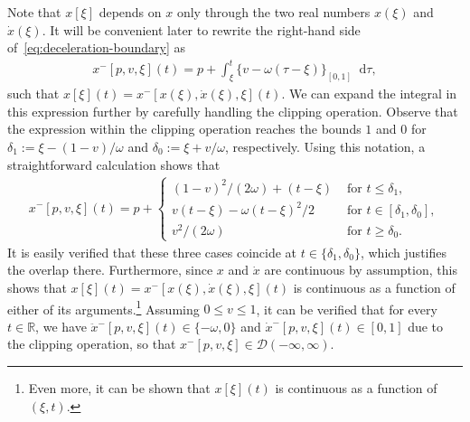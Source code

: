 \documentclass[a4paper]{article}
\theoremstyle{definition}
\theoremstyle{plain}
\newcommand*\diff{\mathop{}\!\mathrm{d}}
\begin{document}
Note that $x[\xi]$ depends on $x$ only through the two real numbers $x(\xi)$ and
$\dot{x}(\xi)$. It will be convenient later to rewrite the right-hand side
of~\eqref{eq:deceleration-boundary} as
\begin{align}
  x^{-}[p, v, \xi](t) = p + \int_{\xi}^{t} \{ v - \omega(\tau - \xi) \}_{[0,1]} \diff \tau ,
\end{align}
such that $x[\xi](t) = x^{-}[x(\xi), \dot{x}(\xi), \xi](t)$.
%
We can expand the integral in this expression further by carefully handling the
clipping operation. Observe that the expression within the clipping operation
reaches the bounds $1$ and $0$ for $\delta_{1} := \xi - (1-v)/\omega$ and
$\delta_{0} := \xi + v/\omega$, respectively. Using this notation, a straightforward
calculation shows that
\begin{align}\label{eq:x-}
  x^{-}[p,v,\xi](t) = p +
  \begin{cases}
    {(1 - v)}^{2} / (2\omega) + (t - \xi) & \text{ for } t \leq \delta_{1} , \\
    v(t - \xi) - \omega{(t-\xi)}^{2} /2 & \text{ for } t \in [\delta_{1} , \delta_{0}] , \\
    v^{2}/(2\omega) & \text{ for } t \geq \delta_{0} .
  \end{cases}
\end{align}
%
It is easily verified that these three cases coincide at
$t \in \{\delta_{1}, \delta_{0}\}$, which justifies the overlap there.
Furthermore, since $x$ and $\dot{x}$ are continuous by assumption, this shows
that $x[\xi](t) = x^{-}[x(\xi), \dot{x}(\xi), \xi](t)$ is continuous as a
function of either of its arguments.\footnote{Even more, it can be shown that
  $x[\xi](t)$ is continuous as a function of $(\xi, t)$.}
%
Assuming $0 \leq v \leq 1$, it can be verified that for every $t \in \mathbb{R}$, we
have $\ddot{x}^{-}[p,v,\xi](t) \in \{-\omega, 0\}$ and
$\dot{x}^{-}[p,v,\xi](t) \in [0,1]$ due to the clipping operation, so that
$x^{-}[p,v,\xi] \in \mathcal{D}(-\infty,\infty)$.
\end{document}
